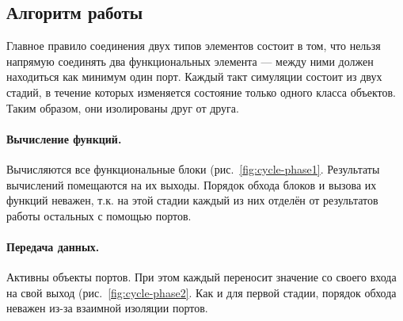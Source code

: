 \subsection{Алгоритм работы}

Главное правило соединения двух типов элементов состоит в том, что нельзя напрямую соединять два функциональных элемента --- между ними должен находиться как минимум один порт. Каждый такт симуляции состоит из двух стадий, в течение которых изменяется состояние только одного класса объектов. Таким образом, они изолированы друг от друга.


\paragraph{Вычисление функций.} Вычисляются все функциональные блоки (рис.~\ref{fig:cycle-phase1}. Результаты вычислений помещаются на их выходы. Порядок обхода блоков и вызова их функций неважен, т.к. на этой стадии каждый из них отделён от результатов работы остальных с помощью портов.

\paragraph{Передача данных.} Активны объекты портов. При этом каждый переносит значение со своего входа на свой выход (рис.~\ref{fig:cycle-phase2}. Как и для первой стадии, порядок обхода неважен из-за взаимной изоляции портов.


